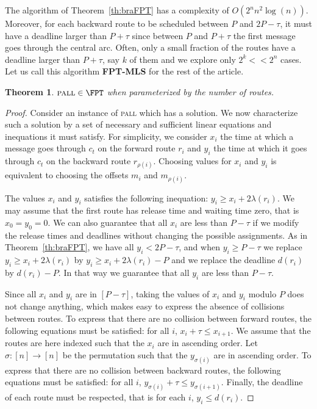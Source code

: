 \documentclass[10pt, conference, letterpaper]{IEEEtran}
\newtheorem{theorem}{Theorem}
\newcommand\pall{\textsc{pall}\xspace}
\begin{document}
The algorithm of Theorem~\ref{th:braFPT} has a complexity of $O(2^nn^2\log(n))$. Moreover, for each backward route to be scheduled between $P$ and $2P-\tau$, it must have a deadline larger than $P + \tau$ since between $P$ and $P + \tau$ the first message goes through the central arc. Often, only a small fraction of the routes have a deadline larger than $P + \tau$, say $k$ of them and we explore only $2^k << 2^n$ cases. Let us call this algorithm {\bf FPT-MLS} for the rest of the article.


\begin{theorem}\label{th:pallFPT}
$\pall \in \FPT$ when parameterized by the number of routes.
\end{theorem}
\begin{proof}
 Consider an instance of \pall which has a solution. We now characterize such a solution by a set of necessary and sufficient linear equations and inequations it must satisfy. 
 For simplicity, we consider $x_i$ the time at which a message goes through $c_t$ on the forward route $r_i$ and $y_i$ the time at which it goes through $c_t$ on the backward route $r_{\rho(i)}$.
 Choosing values for $x_i$ and $y_i$ is equivalent to choosing the offsets $m_i$ and $m_{\rho(i)}$.
 
 The values $x_i$ and $y_i$ satisfies the following inequation: $y_i \geq x_i + 2\lambda(r_i)$.
We may assume that the first route has release time and waiting time zero, 
that is $x_0 = y_0 = 0$. We can also guarantee that all $x_i$ are less than $P-\tau$ if we modify
the release times and deadlines without changing the possible assignments. As in Theorem~\ref{th:braFPT}, we have all $y_i < 2P - \tau$,
and  when $y_i \geq P - \tau$ we replace $y_i \geq x_i + 2\lambda(r_i) $ by $y_i \geq x_i + 2\lambda(r_i) - P$ and we replace the deadline $d(r_i)$ by $d(r_i) -P$. In that way we guarantee that all $y_i$ are less than $P-\tau$.  
 
 Since all $x_i$ and $y_i$ are in $[P-\tau]$, taking the values of $x_i$ and $y_i$ modulo $P$
 does not change anything, which makes easy to express the absence of collisions between routes.
 To express that there are no collision between forward routes, the following equations must be  satisfied: for all $i$, $x_i + \tau \leq x_{i+1}$. We assume that the routes are here indexed such that the $x_i$ are in ascending order.
 Let $\sigma : [n] \rightarrow [n]$ be the permutation such that the $y_{\sigma(i)}$ are in ascending order.
 To express that there are no collision between backward routes, the following equations must be  satisfied: for all $i$, $y_{\sigma(i)} + \tau \leq y_{\sigma(i+1)}$. Finally, the deadline of each route must be respected, that is for each $i$, $y_i \leq d(r_i)$. 


\end{proof}
\end{document}
